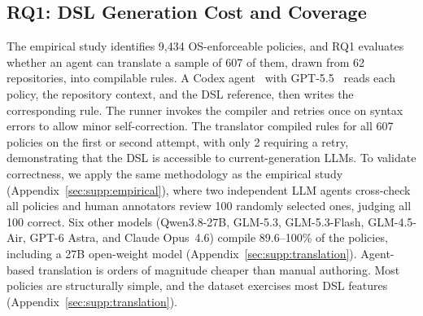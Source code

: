 \subsection{RQ1: DSL Generation Cost and Coverage}
\label{sec:eval:rq1}

The empirical study identifies 9{,}434 OS-enforceable policies, and RQ1 evaluates whether an agent can translate a sample of 607 of them, drawn from 62 repositories, into compilable \sys{} rules.
A Codex agent~\cite{openai2025codex} with GPT-5.5~\cite{openai2026gpt55} reads each policy, the repository context, and the DSL reference, then writes the corresponding \sys{} rule. The runner invokes the compiler and retries once on syntax errors to allow minor self-correction.
The translator compiled rules for all 607 policies on the first or second attempt, with only 2 requiring a retry, demonstrating that the DSL is accessible to current-generation LLMs.
To validate correctness, we apply the same methodology as the empirical study (Appendix~\ref{sec:supp:empirical}), where two independent LLM agents cross-check all policies and human annotators review 100 randomly selected ones, judging all 100 correct.
Six other models (Qwen3.8-27B, GLM-5.3, GLM-5.3-Flash, GLM-4.5-Air, GPT-6 Astra, and Claude Opus~4.6) compile 89.6--100\% of the policies, including a 27B open-weight model (Appendix~\ref{sec:supp:translation}).
Agent-based translation is orders of magnitude cheaper than manual authoring. Most policies are structurally simple, and the dataset exercises most DSL features (Appendix~\ref{sec:supp:translation}).

